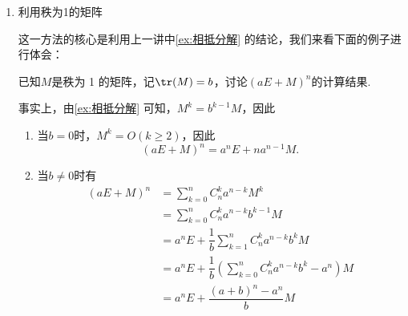 \begin{enumerate}
    \item 利用秩为1的矩阵

          这一方法的核心是利用上一讲中\autoref{ex:相抵分解} 的结论，我们来看下面的例子进行体会：
          \begin{example}{}{}
              已知$M$是秩为 1 的矩阵，记$\tr(M)=b$，讨论$(aE+M)^n$的计算结果.
          \end{example}
          \begin{solution}
              事实上，由\autoref{ex:相抵分解} 可知，$M^k=b^{k-1}M$，因此
              \begin{enumerate}
                  \item 当$b=0$时，$M^k=O(k\geqslant 2)$，因此
                        \[(aE+M)^n=a^nE+na^{n-1}M.\]

                  \item 当$b\neq 0$时有
                        \begin{align*}
                            (aE+M)^n & =\sum\limits_{k=0}^nC_n^ka^{n-k}M^k                                    \\
                                     & =\sum\limits_{k=0}^nC_n^ka^{n-k}b^{k-1}M                               \\
                                     & =a^nE+\dfrac{1}{b}\sum\limits_{k=1}^nC_n^ka^{n-k}b^kM                  \\
                                     & =a^nE+\dfrac{1}{b}\left(\sum\limits_{k=0}^nC_n^ka^{n-k}b^k-a^n\right)M \\
                                     & =a^nE+\dfrac{(a+b)^n-a^n}{b}M
                        \end{align*}
              \end{enumerate}
          \end{solution}


\end{enumerate}
